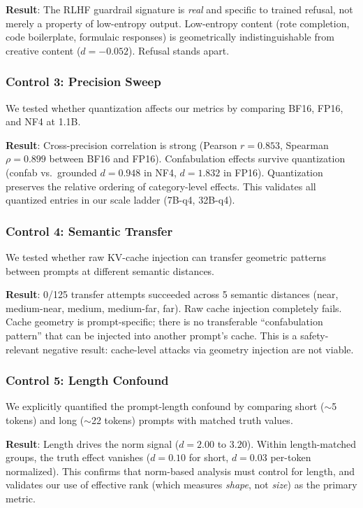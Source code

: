 \documentclass[11pt,a4paper]{article}
\begin{document}
\textbf{Result}: The RLHF guardrail signature is \emph{real} and specific to trained refusal, not merely a property of low-entropy output. Low-entropy content (rote completion, code boilerplate, formulaic responses) is geometrically indistinguishable from creative content ($d = -0.052$). Refusal stands apart.

\subsubsection{Control 3: Precision Sweep}

We tested whether quantization affects our metrics by comparing BF16, FP16, and NF4 at 1.1B.

\textbf{Result}: Cross-precision correlation is strong (Pearson $r = 0.853$, Spearman $\rho = 0.899$ between BF16 and FP16). Confabulation effects survive quantization (confab vs.\ grounded $d = 0.948$ in NF4, $d = 1.832$ in FP16). Quantization preserves the relative ordering of category-level effects. This validates all quantized entries in our scale ladder (7B-q4, 32B-q4).

\subsubsection{Control 4: Semantic Transfer}

We tested whether raw KV-cache injection can transfer geometric patterns between prompts at different semantic distances.

\textbf{Result}: 0/125 transfer attempts succeeded across 5 semantic distances (near, medium-near, medium, medium-far, far). Raw cache injection completely fails. Cache geometry is prompt-specific; there is no transferable ``confabulation pattern'' that can be injected into another prompt's cache. This is a safety-relevant negative result: cache-level attacks via geometry injection are not viable.

\subsubsection{Control 5: Length Confound}

We explicitly quantified the prompt-length confound by comparing short ($\sim$5 tokens) and long ($\sim$22 tokens) prompts with matched truth values.

\textbf{Result}: Length drives the norm signal ($d = 2.00$ to $3.20$). Within length-matched groups, the truth effect vanishes ($d = 0.10$ for short, $d = 0.03$ per-token normalized). This confirms that norm-based analysis must control for length, and validates our use of effective rank (which measures \emph{shape}, not \emph{size}) as the primary metric.
\end{document}
